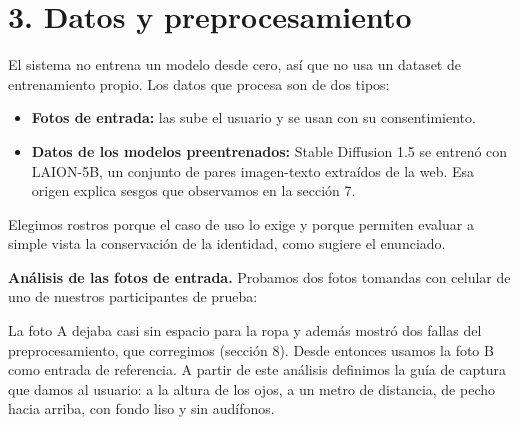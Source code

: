 \documentclass[conference]{IEEEtran}
\begin{document}
\section*{3. Datos y preprocesamiento}

El sistema no entrena un modelo desde cero, así que no usa un dataset de entrenamiento propio. Los datos que procesa son de dos tipos:

\begin{itemize}
\item \textbf{Fotos de entrada:} las sube el usuario y se usan con su consentimiento.
\item \textbf{Datos de los modelos preentrenados:} Stable Diffusion 1.5 se entrenó con LAION-5B, un conjunto de pares imagen-texto extraídos de la web. Esa origen explica sesgos que observamos en la sección 7.
\end{itemize}

Elegimos rostros porque el caso de uso lo exige y porque permiten evaluar a simple vista la conservación de la identidad, como sugiere el enunciado.

\textbf{Análisis de las fotos de entrada.} Probamos dos fotos tomandas con celular de uno de nuestros participantes de prueba:


\begin{table}[htbp]
\centering
\caption{Evaluación de las fotografías de entrada y detección facial.}
\label{tab:evaluacion-fotos}
\footnotesize
\renewcommand{\arraystretch}{1.25}
\end{table}


La foto A dejaba casi sin espacio para la ropa y además mostró dos fallas del preprocesamiento, que corregimos (sección 8). Desde entonces usamos la foto B como entrada de referencia. A partir de este análisis definimos la guía de captura que damos al usuario: a la altura de los ojos, a un metro de distancia, de pecho hacia arriba, con fondo liso y sin audífonos.
\end{document}
